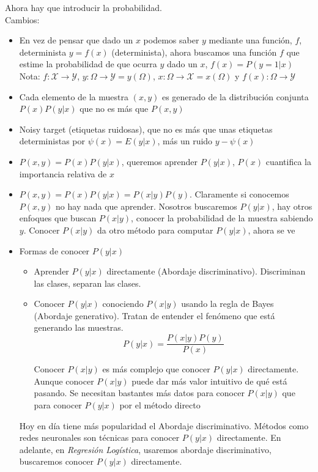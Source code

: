 \documentclass[11pt,a4paper]{article}
\theoremstyle{definition}
\begin{document}
	Ahora hay que introducir la probabilidad.\\
	Cambios:
	\begin{itemize}
	\item En vez de pensar que dado un $x$ podemos saber $y$ mediante una función, $f$, determinista $y=f(x)$ (determinista), ahora buscamos una función $f$ que estime la probabilidad de que ocurra $y$ dado un $x$, $f(x)=P(y=1|x)$\\ Nota: $f\colon \mathcal X \to \mathcal Y$, $y\colon \Omega \to \mathcal Y=y(\Omega)$, $x\colon \Omega \to \mathcal X = x(\Omega)$ y $f(x)\colon \Omega \to \mathcal Y$
	\item Cada elemento de la muestra $(x,y)$ es generado de la distribución conjunta $P(x)P(y|x)$ que no es más que $P(x,y)$
	\item Noisy target (etiquetas ruidosas), que no es más que unas etiquetas deterministas por $\psi(x)=E(y|x)$, más un ruido $y-\psi(x)$
	\item $P(x,y)=P(x)P(y|x)$, queremos aprender $P(y|x)$, $P(x)$ cuantifica la importancia relativa de $x$
	\item $P(x,y)=P(x)P(y|x)=P(x|y)P(y)$. Claramente si conocemos $P(x,y)$ no hay nada que aprender. Nosotros buscaremos $P(y|x)$, hay otros enfoques que buscan $P(x|y)$, conocer la probabilidad de la muestra sabiendo $y$. Conocer $P(x|y)$ da otro método para computar $P(y|x)$, ahora se ve
	\item Formas de conocer $P(y|x)$
	\begin{itemize}
		\item Aprender $P(y|x)$ directamente (Abordaje discriminativo). Discriminan las clases, separan las clases.
		\item Conocer $P(y|x)$ conociendo $P(x|y)$ usando la regla de Bayes (Abordaje generativo). Tratan de entender el fenómeno que está generando las muestras.
		$$P(y|x)=\frac{P(x|y)P(y)}{P(x)}$$
		
		Conocer $P(x|y)$ es más complejo que conocer $P(y|x)$ directamente. Aunque conocer $P(x|y)$ puede dar más valor intuitivo de qué está pasando. Se necesitan bastantes más datos para conocer $P(x|y)$ que para conocer $P(y|x)$ por el método directo
	\end{itemize}
	Hoy en día tiene más popularidad el Abordaje discriminativo. Métodos como redes neuronales son técnicas para conocer $P(y|x)$ directamente. En adelante, en \textit{Regresión Logística}, usaremos abordaje discriminativo, buscaremos conocer $P(y|x)$ directamente.
	\end{itemize}
	
\end{document}
